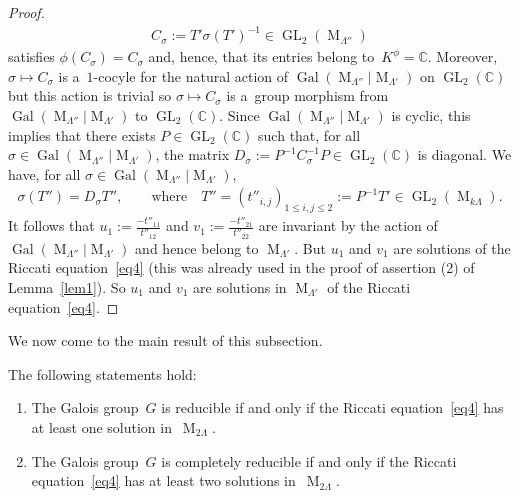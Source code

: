 \begin{proof}
\begin{gather*}
C_{\sigma}:=T' \sigma (T' )^{-1} \in \operatorname{GL}_{2}(\operatorname{M}_{\Lambda''})
\end{gather*}
satisf\/ies $\phi (C_{\sigma}) = C_{\sigma}$ and, hence, that its entries belong to~$K^{\phi} = \mathbb C$.
Moreover, $\sigma \mapsto C_{\sigma}$ is a~$1$-cocyle for the natural action of
$\operatorname{Gal}(\operatorname{M}_{\Lambda''}|\operatorname{M}_{\Lambda'})$ on $\operatorname{GL}_{2}(\mathbb C)$
but this action is trivial so $\sigma \mapsto C_{\sigma}$ is a~group morphism
from~$\operatorname{Gal}(\operatorname{M}_{\Lambda''}|\operatorname{M}_{\Lambda'})$ to $\operatorname{GL}_{2}(\mathbb
C)$.
Since $\operatorname{Gal}(\operatorname{M}_{\Lambda''}|\operatorname{M}_{\Lambda'})$ is cyclic, this implies that there
exists $P\in \operatorname{GL}_{2}(\mathbb C)$ such that, for all $\sigma\in
\operatorname{Gal}(\operatorname{M}_{\Lambda''}|\operatorname{M}_{\Lambda'})$, the matrix
${D_{\sigma}:=P^{-1}C_{\sigma}^{-1}P} \in \operatorname{GL}_{2}(\mathbb C)$ is diagonal.
We have, for all $\sigma \in\operatorname{Gal}(\operatorname{M}_{\Lambda''}|\operatorname{M}_{\Lambda'})$,
\begin{gather*}
\sigma(T'')=D_{\sigma}T'',\qquad  \text{where} \quad T''=(t''_{i,j})_{1 \leq i,j \leq 2}:=P^{-1}T' \in
\operatorname{GL}_{2}(\operatorname{M}_{k \Lambda}).
\end{gather*}
It follows that $u_{1}:=\frac{-t''_{11}}{t''_{12}}$ and $v_{1}:=\frac{-t''_{21}}{t''_{22}}$ are invariant by the action
of $\operatorname{Gal}(\operatorname{M}_{\Lambda''}|\operatorname{M}_{\Lambda'})$ and hence belong to
$\operatorname{M}_{\Lambda'}$.
But $u_{1}$ and $v_{1}$ are solutions of the Riccati equation~\eqref{eq4} (this was already used in the proof of
assertion (2) of Lemma~\ref{lem1}).
So $u_{1}$ and $v_{1}$ are solutions in $\operatorname{M}_{\Lambda'}$ of the Riccati equation~\eqref{eq4}.
\end{proof}

We now come to the main result of this subsection.

\begin{Theorem}
\label{theo2}
The following statements hold:
\begin{enumerate}
\itemsep=0pt
\item[$1.$] The Galois group~$G$ is reducible if and only if the Riccati equation~\eqref{eq4} has at least one solution
in~$\operatorname{M}_{2\Lambda}$.
\item[$2.$] The Galois group~$G$ is completely reducible if and only if the Riccati equation~\eqref{eq4} has at least two
solutions in~$\operatorname{M}_{2\Lambda}$.
\end{enumerate}
\end{Theorem}

